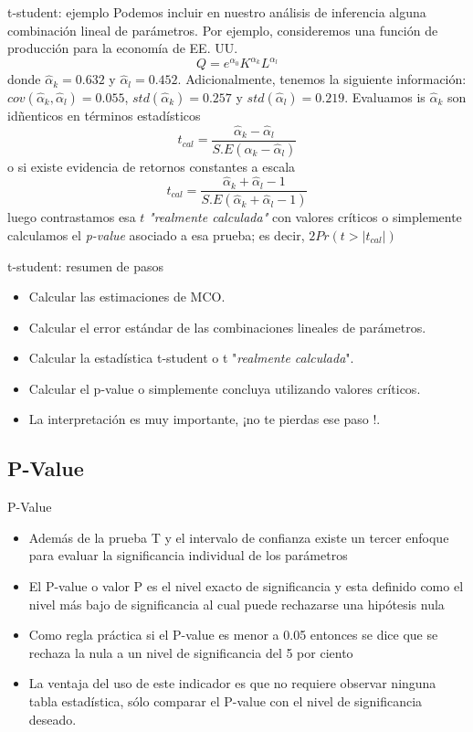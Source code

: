 \begin{frame}{t-student: ejemplo}
	Podemos incluir en nuestro análisis de inferencia alguna combinación lineal de parámetros. Por ejemplo, consideremos una función de producción para la economía de EE. UU.
		$$Q = e^{\alpha_0}K^{\alpha_k}L^{\alpha_l}$$
	donde $\widehat{\alpha}_k = 0.632$ y $\widehat{\alpha}_l = 0.452$. Adicionalmente, tenemos la siguiente información: $cov(\widehat{\alpha}_k, \widehat{\alpha}_l)= 0.055$, $std(\widehat{\alpha}_k)=0.257$ y $std(\widehat{\alpha}_l)=0.219$. Evaluamos is $\widehat{\alpha}_k$ son idñenticos en términos estadísticos
		$$t_{cal}= \frac{\widehat{\alpha}_k - \widehat{\alpha}_l}{S.E(\widehat{\alpha}_k - \widehat{\alpha}_l)}$$
	o si existe evidencia de retornos constantes a escala
		$$t_{cal}= \frac{\widehat{\alpha}_k + \widehat{\alpha}_l - 1}{S.E(\widehat{\alpha}_k + \widehat{\alpha}_l - 1)}$$
	luego contrastamos esa $t$ \textit{"realmente calculada"} con valores críticos o simplemente calculamos el \textit{p-value} asociado a esa prueba; es decir, $2Pr(t > |t_{cal}|)$
\end{frame}
\begin{frame}{t-student: resumen de pasos}
	\begin{itemize}
		\item Calcular las estimaciones de MCO.
		\item Calcular el error estándar de las combinaciones lineales de parámetros.
		\item Calcular la estadística t-student o t "\textit{realmente calculada}".
		\item Calcular el p-value o simplemente concluya utilizando valores críticos.
		\item La interpretación es muy importante, ¡no te pierdas ese paso !.
	\end{itemize}
\end{frame}

\subsection{P-Value}
\begin{frame}{P-Value}
	\begin{itemize}
		\item Además de la prueba T y el intervalo de confianza existe un tercer enfoque para evaluar la significancia individual de los parámetros
		\item El P-value o valor P es el nivel exacto de significancia y esta definido como el nivel más bajo  de significancia al cual puede rechazarse una hipótesis nula
		\item Como regla práctica si el P-value es menor a 0.05 entonces se dice que se rechaza la nula a un nivel de significancia del 5 por ciento
		\item La ventaja del uso de este indicador es que no requiere observar ninguna tabla estadística, sólo comparar el P-value con el nivel de significancia deseado.
	\end{itemize}
\end{frame}